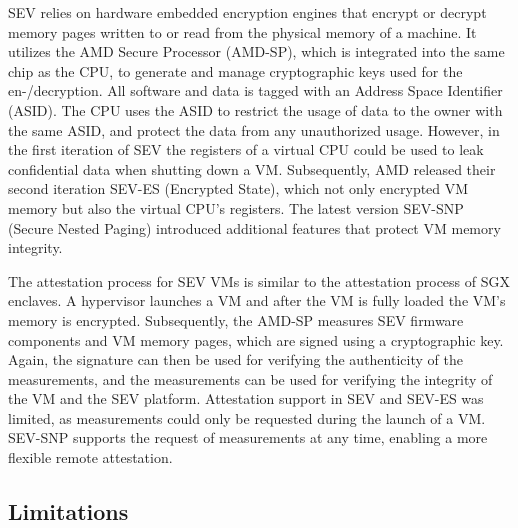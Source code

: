 \begin{description}
    SEV relies on hardware embedded encryption engines that encrypt or decrypt
    memory pages written to or read from the physical memory of a machine. It
    utilizes the AMD Secure Processor (AMD-SP), which is integrated into the
    same chip as the CPU, to generate and manage cryptographic keys used for the
    en-/decryption. All software and data is tagged with an Address Space
    Identifier (ASID). The CPU uses the ASID to restrict the usage of data to
    the owner with the same ASID, and protect the data from any unauthorized
    usage. However, in the first iteration of SEV the registers of a virtual CPU
    could be used to leak confidential data when shutting down a VM.
    Subsequently, AMD released their second iteration SEV-ES (Encrypted State),
    which not only encrypted VM memory but also the virtual CPU's registers. The
    latest version SEV-SNP (Secure Nested Paging) introduced additional features
    that protect VM memory integrity.

    The attestation process for SEV VMs is similar to the attestation process of
    SGX enclaves. A hypervisor launches a VM and after the VM is fully loaded
    the VM's memory is encrypted. Subsequently, the AMD-SP measures SEV firmware
    components and VM memory pages, which are signed using a cryptographic key.
    Again, the signature can then be used for verifying the authenticity of the
    measurements, and the measurements can be used for verifying the integrity
    of the VM and the SEV platform. Attestation support in SEV and SEV-ES was
    limited, as measurements could only be requested during the launch of a VM.
    SEV-SNP supports the request of measurements at any time, enabling a more
    flexible remote attestation.
\end{description}

\subsection{Limitations}
\label{sec:limitations}

